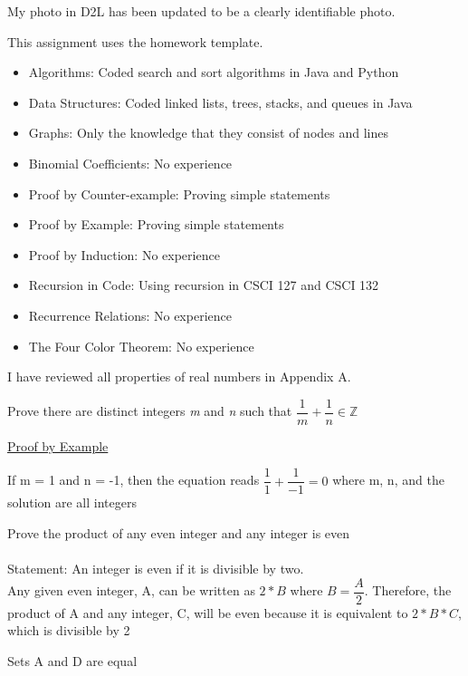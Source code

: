 \documentclass{article}
\author{Nathan Stouffer}
\begin{document}
My photo in D2L has been updated to be a clearly identifiable photo.

\clearpage
\header
This assignment uses the homework template.

\clearpage
\header
\begin{itemize}
	\item Algorithms: Coded search and sort algorithms in Java and Python
	\item Data Structures: Coded linked lists, trees, stacks, and queues in Java
	\item Graphs: Only the knowledge that they consist of nodes and lines
	\item Binomial Coefficients: No experience
	\item Proof by Counter-example: Proving simple statements
	\item Proof by Example: Proving simple statements
	\item Proof by Induction: No experience
	\item Recursion in Code: Using recursion in CSCI 127 and CSCI 132
	\item Recurrence Relations: No experience
	\item The Four Color Theorem: No experience
\end{itemize}

\clearpage
\header
I have reviewed all properties of real numbers in Appendix A.

\clearpage
\header
Prove there are distinct integers \emph{m} and \emph{n} such that $\dfrac{1}{m}+\dfrac{1}{n} \in \mathbb{Z}$
\begin{center}
	\underline{Proof by Example}
\end{center}
If m = 1 and n = -1, then the equation reads $\dfrac{1}{1}+\dfrac{1}{-1}=0$ where m, n, and the solution are all integers

\clearpage
\header
Prove the product of any even integer and any integer is even
\\\\
Statement: An integer is even if it is divisible by two.
\\
Any given even integer, A, can be written as $2*B$ where $B=\dfrac{A}{2}$. Therefore, the product of A and any integer, C, will be even because it is equivalent to $2*B*C$, which is divisible by 2

\clearpage
\header
Sets A and D are equal
\end{document}
